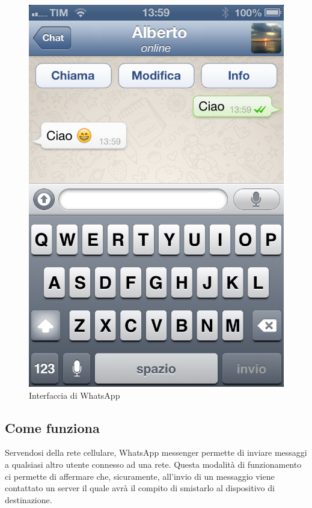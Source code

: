 \documentclass[a4paper,11pt]{book}
\begin{document}
\begin{figure}[!ht]
\centering
\includegraphics[scale = 0.3]{Whatsapp.png}
\caption{Interfaccia di WhatsApp}
\end{figure}

\clearpage

\subsection{Come funziona}
Servendosi della rete cellulare, WhatsApp messenger permette di inviare messaggi a qualsiasi altro utente connesso ad una rete. Questa modalit\`a di funzionamento ci permette di affermare che, sicuramente, all'invio di un messaggio viene contattato un server il quale avr\`a il compito di smistarlo al dispositivo di destinazione.
\end{document}
